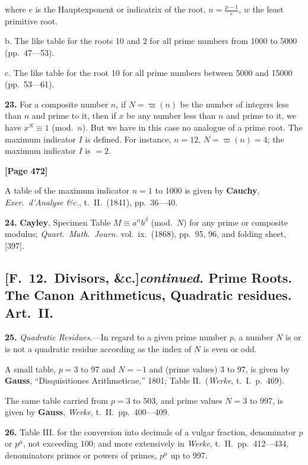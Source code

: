 \documentclass[11pt,a4paper]{book}
\begin{document}
where $e$ is the Hauptexponent or indicatrix of the root, $n = \frac{p-1}{e}$, $w$ the least primitive root.

b. The like table for the roots 10 and 2 for all prime numbers from 1000 to 5000 (pp.\ 47---53).

c. The like table for the root 10 for all prime numbers between 5000 and 15000 (pp.\ 53---61).

\textbf{23.} For a composite number $n$, if $N = \varpi(n)$ be the number of integers less than $n$ and prime to it,
then if $x$ be any number less than $n$ and prime to it, we have $x^{N} \equiv 1$ (mod.\ $n$).
But we have in this case no analogue of a prime root. The maximum indicator $I$ is defined.
For instance, $n = 12$, $N = \varpi(n) = 4$; the maximum indicator $I$ is $= 2$.

\newpage
\textbf{[Page 472]}

A table of the maximum indicator $n = 1$ to 1000 is given by
\quad\textbf{Cauchy}, \textit{Exer.\ d'Analyse \&c.}, t.\ II.\ (1841), pp.\ 36---40.

\textbf{24.} \textbf{Cayley}, Specimen Table $M \equiv a^{\alpha}b^{\beta}$ (mod.\ $N$) for any prime or composite modulus;
\textit{Quart.\ Math.\ Journ.} vol.\ ix.\ (1868), pp.\ 95, 96, and folding sheet, [397].

\subsection*{[F.\ 12.\ Divisors, \&c.]\textit{continued.} Prime Roots. The Canon Arithmeticus, Quadratic residues. Art.\ II.}

\textbf{25.} \textit{Quadratic Residues.}---In regard to a given prime number $p$, a number $N$ is or is not a quadratic residue
according as the index of $N$ is even or odd.

A small table, $p = 3$ to 97 and $N = -1$ and (prime values) 3 to 97, is given by
\quad\textbf{Gauss}, ``Disquisitiones Arithmeticae,'' 1801; Table II.\ (\textit{Werke}, t.\ I.\ p.\ 469).

The same table carried from $p = 3$ to 503, and prime values $N = 3$ to 997, is given by
\quad\textbf{Gauss}, \textit{Werke}, t.\ II.\ pp.\ 400---409.

\textbf{26.} Table III. for the conversion into decimals of a vulgar fraction, denominator $p$ or $p^{\mu}$, not exceeding 100;
and more extensively in \textit{Werke}, t.\ II.\ pp.\ 412---434, denominators primes or powers of primes, $p^{\mu}$ up to 997.
\end{document}
